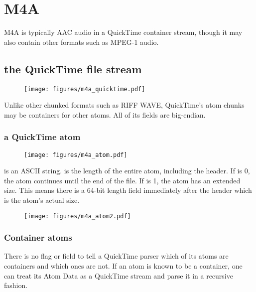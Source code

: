 
\chapter{M4A}
\label{m4a}
M4A is typically AAC audio in a QuickTime container stream, though
it may also contain other formats such as MPEG-1 audio.

\section{the QuickTime file stream}
\begin{figure}[h]
\texttt{[image: figures/m4a\_quicktime.pdf]}
\end{figure}
\par
\noindent
Unlike other chunked formats such as RIFF WAVE, QuickTime's atom chunks
may be containers for other atoms.  All of its fields are big-endian.
\subsection{a QuickTime atom}
\begin{figure}[h]
\texttt{[image: figures/m4a\_atom.pdf]}
\end{figure}
 is an ASCII string.
 is the length of the entire atom, including the header.
If  is 0, the atom continues until the end of the file.
If  is 1, the atom has an extended size.  This means
there is a 64-bit length field immediately after the header which is
the atom's actual size.
\begin{figure}[h]
\texttt{[image: figures/m4a\_atom2.pdf]}
\end{figure}
\subsection{Container atoms}
There is no flag or field to tell a QuickTime parser which
of its atoms are containers and which ones are not.
If an atom is known to be a container, one can treat its Atom Data
as a QuickTime stream and parse it in a recursive fashion.
